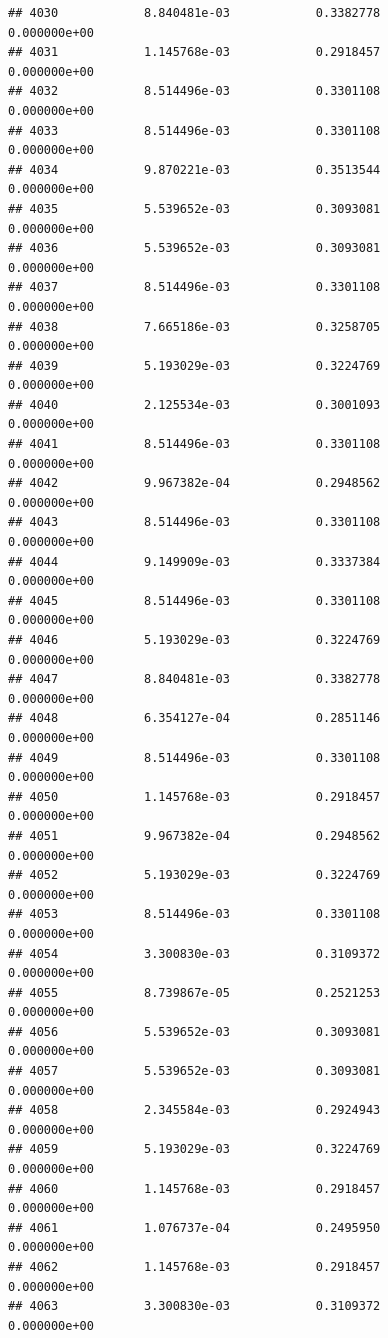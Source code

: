 \documentclass[
]{article}
\begin{document}
\begin{verbatim}
## 4030            8.840481e-03            0.3382778            0.000000e+00
## 4031            1.145768e-03            0.2918457            0.000000e+00
## 4032            8.514496e-03            0.3301108            0.000000e+00
## 4033            8.514496e-03            0.3301108            0.000000e+00
## 4034            9.870221e-03            0.3513544            0.000000e+00
## 4035            5.539652e-03            0.3093081            0.000000e+00
## 4036            5.539652e-03            0.3093081            0.000000e+00
## 4037            8.514496e-03            0.3301108            0.000000e+00
## 4038            7.665186e-03            0.3258705            0.000000e+00
## 4039            5.193029e-03            0.3224769            0.000000e+00
## 4040            2.125534e-03            0.3001093            0.000000e+00
## 4041            8.514496e-03            0.3301108            0.000000e+00
## 4042            9.967382e-04            0.2948562            0.000000e+00
## 4043            8.514496e-03            0.3301108            0.000000e+00
## 4044            9.149909e-03            0.3337384            0.000000e+00
## 4045            8.514496e-03            0.3301108            0.000000e+00
## 4046            5.193029e-03            0.3224769            0.000000e+00
## 4047            8.840481e-03            0.3382778            0.000000e+00
## 4048            6.354127e-04            0.2851146            0.000000e+00
## 4049            8.514496e-03            0.3301108            0.000000e+00
## 4050            1.145768e-03            0.2918457            0.000000e+00
## 4051            9.967382e-04            0.2948562            0.000000e+00
## 4052            5.193029e-03            0.3224769            0.000000e+00
## 4053            8.514496e-03            0.3301108            0.000000e+00
## 4054            3.300830e-03            0.3109372            0.000000e+00
## 4055            8.739867e-05            0.2521253            0.000000e+00
## 4056            5.539652e-03            0.3093081            0.000000e+00
## 4057            5.539652e-03            0.3093081            0.000000e+00
## 4058            2.345584e-03            0.2924943            0.000000e+00
## 4059            5.193029e-03            0.3224769            0.000000e+00
## 4060            1.145768e-03            0.2918457            0.000000e+00
## 4061            1.076737e-04            0.2495950            0.000000e+00
## 4062            1.145768e-03            0.2918457            0.000000e+00
## 4063            3.300830e-03            0.3109372            0.000000e+00

\end{verbatim}
\end{document}
